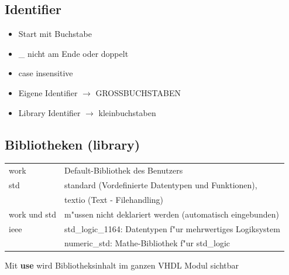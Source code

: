 \begin{minipage}{0.4\textwidth}
\subsection{Identifier}
		\begin{itemize}
			\setlength{\itemsep}{0pt}
  			\setlength{\parskip}{0pt}
  			\setlength{\parsep}{0pt}
				\item Start mit Buchstabe
				\item \_ nicht am Ende oder doppelt
				\item case insensitive
				\item Eigene Identifier $\rightarrow$ GROSSBUCHSTABEN
				\item Library Identifier $\rightarrow$ kleinbuchstaben
		\end{itemize}
\end{minipage}	
\begin{minipage}{0.59\textwidth}
\subsection{Bibliotheken (library)}
		\begin{tabular}{ll}
			work & Default-Bibliothek des Benutzers \\
			std & standard (Vordefinierte Datentypen und Funktionen),\\
			& textio (Text -  Filehandling)\\
			work und std &m"ussen nicht deklariert werden (automatisch eingebunden)\\
			ieee & std\_logic\_1164: Datentypen f"ur mehrwertiges Logiksystem\\
			& numeric\_std: Mathe-Bibliothek f"ur std\_logic
		\end{tabular}
\end{minipage}
	
\vspace{-\baselineskip}
\begin{multicols}{2}
	
\end{multicols}
Mit \textbf{use} wird Bibliotheksinhalt im ganzen VHDL Modul sichtbar

